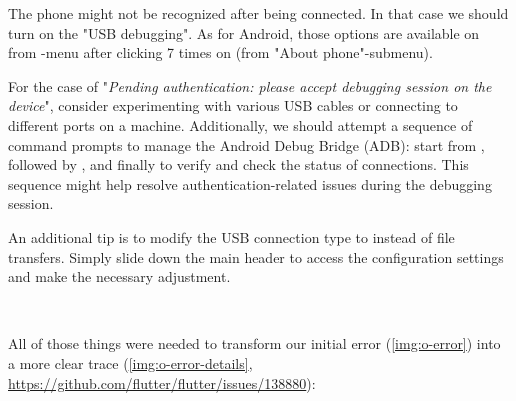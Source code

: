 
\noindent The phone might not be recognized after being connected. In that case we should turn on the "USB debugging".
As for Android, those options are available on  from -menu after clicking 7 times 
on  (from "About phone"-submenu).

For the case of "\emph{Pending authentication: please accept debugging session on the device}", consider experimenting 
with various USB cables or connecting to different ports on a machine. Additionally, we should attempt a sequence of 
command prompts to manage the Android Debug Bridge (ADB): start from , followed by 
, and finally  to verify and check the status of connections. This sequence might 
help resolve authentication-related issues during the debugging session.

An additional tip is to modify the USB connection type to  instead of file transfers. Simply slide down the 
main header to access the configuration settings and make the necessary adjustment.

~

\noindent All of those things were needed to transform our initial error (\cref{img:o-error}) into a more clear trace 
(\cref{img:o-error-details}, 
\href{https://github.com/flutter/flutter/issues/138880}{https://github.com/flutter/flutter/issues/138880}):

